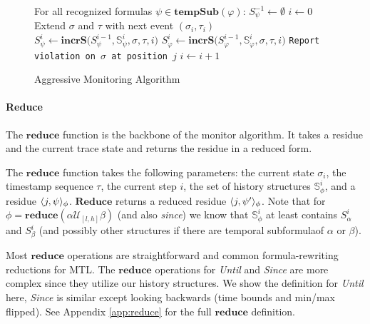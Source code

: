 \begin{figure}
\begin{algorithmic}[1]
\STATE For all recognized formulas $\psi \in \mathbf{tempSub}(\varphi)$: $S^{-1}_{\psi} \leftarrow \emptyset$
\STATE $i \leftarrow 0$
\LOOP
\STATE Extend $\sigma$ and $\tau$ with next event $(\sigma_i,\tau_i)$
	\STATE $S^i_{\psi} \leftarrow \mathbf{incrS(} S^{i-1}_{\psi}, \mathbb{S}^i_{\psi}, \sigma, \tau, i)$
\ENDFOR
\STATE $S^i_{\varphi} \leftarrow \mathbf{incrS(} S^{i-1}_{\varphi}, \mathbb{S}^i_{\varphi}, \sigma, \tau, i)$
\STATE \texttt{Report violation on $\sigma$ at position $j$}
\ENDFOR
\STATE $i \leftarrow i + 1$
\ENDLOOP
\end{algorithmic}
\caption{Aggressive Monitoring Algorithm}\label{fig:ag_algorithm}
\end{figure}



\paragraph{Reduce}
The $\mathbf{reduce}$ function is the backbone of the monitor algorithm. It takes a residue and the current trace state and returns the residue in a reduced form.

The $\mathbf{reduce}$ function takes the following parameters: the current state $\sigma_i$, the timestamp sequence $\tau$, the current step $i$, the set of history structures $\mathbb{S}^i_{\phi}$, and a residue $\langle j, \psi \rangle_{\phi}$. $\mathbf{Reduce}$ returns a reduced residue $\langle j, \psi' \rangle_{\phi}$. Note that for $\phi = \mathbf{reduce}(\alpha \mathcal{U}_{[l,h]} \beta)$ (and also \emph{since}) we know that $\mathbb{S}^i_\phi$ at least contains $S^i_\alpha$ and $S^i_\beta$ (and possibly other structures if there are temporal subformulaof $\alpha$ or $\beta$).

Most $\mathbf{reduce}$ operations are straightforward and common formula-rewriting reductions for MTL. The $\mathbf{reduce}$ operations for \emph{Until} and \emph{Since} are more complex since they utilize our history structures. We show the definition for \emph{Until} here, \emph{Since} is similar except looking backwards (time bounds and min/max flipped). See Appendix \ref{app:reduce} for the full $\mathbf{reduce}$ definition.

